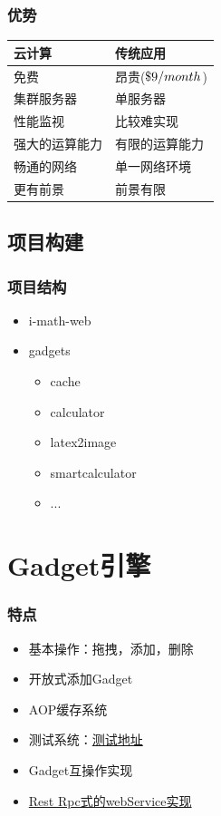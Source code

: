 \documentclass[dvipdfm,serif,mathserif]{beamer}
\renewcommand{\textdollar}{{\char"0024}}
\begin{document}
\begin{frame}
  \frametitle{优势}
\begin{center}
\begin{tabular}{m{}m{}}
\toprule
云计算 & 传统应用 \\
\midrule
\rowcolor{lgray}
免费   & 昂贵($ \textdollar 9 / month$)    \\
集群服务器   & 单服务器   \\
\rowcolor{lgray}
性能监视  & 比较难实现   \\
强大的运算能力   & 有限的运算能力   \\
\rowcolor{lgray}
畅通的网络   & 单一网络环境   \\
更有前景  & 前景有限   \\
\bottomrule
\end{tabular}
\end{center}
\end{frame}

\subsection{项目构建}
\begin{frame}
  \frametitle{项目结构}
\begin{itemize}
 \item i-math-web
\item gadgets
\begin{itemize}
 \item cache
 \item calculator
 \item latex2image
 \item smartcalculator
 \item ...
\end{itemize}
\end{itemize}
\end{frame}

\section{Gadget引擎}

\begin{frame}
  \frametitle{特点}
\begin{itemize}
\item 基本操作：拖拽，添加，删除
\item 开放式添加Gadget
\item AOP缓存系统
\item 测试系统：\href{ http://i-math.appspot.com/ifr.action?url=http://i-math.appspot.com/gadgets/add-gadget/add-gadget.xml}{\color{blue}测试地址}
\item Gadget互操作实现
\item \href{http://i-math.appspot.com/dwr/index.html}{\color{blue}Rest Rpc式的webService实现}
\end{itemize}
\end{frame}
\end{document}
